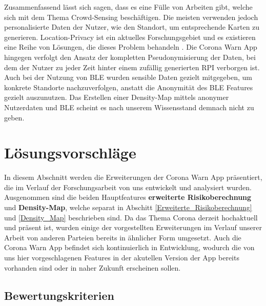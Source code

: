 \documentclass[conference,compsoc]{IEEEtran}
\begin{document}
Zusammenfassend lässt sich sagen, dass es eine Fülle von Arbeiten gibt, welche sich mit dem Thema Crowd-Sensing beschäftigen. 
Die meisten verwenden jedoch personalisierte Daten der Nutzer, wie den Standort, um entsprechende Karten zu generieren. 
Location-Privacy ist ein aktuelles Forschungsgebiet und es existieren eine Reihe von Lösungen, die dieses Problem behandeln \cite{Location}. 
Die Corona Warn App hingegen verfolgt den Ansatz der kompletten Pseudonymisierung der Daten, bei dem der Nutzer zu jeder Zeit hinter einem zufällig generierten RPI verborgen ist. 
Auch bei der Nutzung von BLE wurden sensible Daten gezielt mitgegeben, um konkrete Standorte nachzuverfolgen, anstatt die Anonymität des BLE Features gezielt auszunutzen. 
Das Erstellen einer Density-Map mittels anonymer Nutzerdaten und BLE scheint es nach unserem Wissensstand demnach nicht zu geben. 

\section{Lösungsvorschläge} \label{Nebenfeatures}
In diesem Abschnitt werden die Erweiterungen der Corona Warn App präsentiert, die im Verlauf der Forschungsarbeit von uns entwickelt und analysiert wurden. 
Ausgenommen sind die beiden Hauptfeatures \textbf{erweiterte Risikoberechnung} und \textbf{Density-Map}, welche separat in Abschitt \ref{Erweiterte_Risikoberechnung} und \ref{Density_Map} beschrieben sind.
Da das Thema Corona derzeit hochaktuell und präsent ist, wurden einige der vorgestellten Erweiterungen im Verlauf unserer Arbeit von anderen Parteien bereits in ähnlicher Form umgesetzt.
Auch die Corona Warn App befindet sich kontinuierlich in Entwicklung, wodurch die von uns hier vorgeschlagenen Features in der akutellen Version der App bereits vorhanden sind oder in naher Zukunft erscheinen sollen. 

\subsection{Bewertungskriterien}
\label{Bewertungskriterien}
\end{document}
